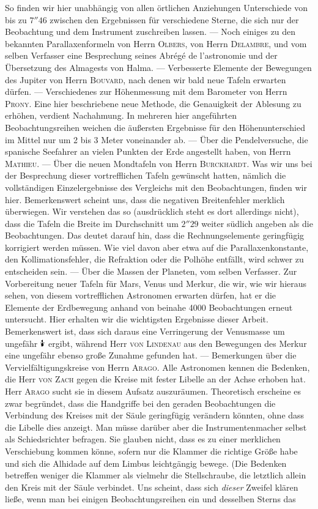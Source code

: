 So finden wir hier unabhängig von allen örtlichen Anziehungen Unterschiede von bis zu $7''46$ zwischen den Ergebnissen für verschiedene Sterne, die sich nur der Beobachtung und dem Instrument zuschreiben lassen. --- Noch einiges zu den bekannten Parallaxenformeln von Herrn \textsc{Olbers}, von Herrn \textsc{Delambre}, und vom selben Verfasser eine Besprechung seines Abrégé de l'astronomie und der Übersetzung des Almagests von Halma. --- Verbesserte Elemente der Bewegungen des Jupiter von Herrn \textsc{Bouvard}, nach denen wir bald neue Tafeln erwarten dürfen. --- Verschiedenes zur Höhenmessung mit dem Barometer von Herrn \textsc{Prony}. Eine hier beschriebene neue Methode, die Genauigkeit der Ablesung zu erhöhen, verdient Nachahmung. In mehreren hier angeführten Beobachtungsreihen weichen die äußersten Ergebnisse für den Höhenunterschied im Mittel nur um 2 bis 3 Meter voneinander ab. --- Über die Pendelversuche, die spanische Seefahrer an vielen Punkten der Erde angestellt haben, von Herrn \textsc{Mathieu}. --- Über die neuen Mondtafeln von Herrn \textsc{Burckhardt}. Was wir uns bei der Besprechung dieser vortrefflichen Tafeln gewünscht hatten, nämlich die vollständigen Einzelergebnisse des Vergleichs mit den Beobachtungen, finden wir hier. Bemerkenswert scheint uns, dass die negativen Breitenfehler merklich überwiegen. Wir verstehen das so (ausdrücklich steht es dort allerdings nicht), dass die Tafeln die Breite im Durchschnitt um $2''29$ weiter südlich angeben als die Beobachtungen. Das deutet darauf hin, dass die Rechnungselemente geringfügig korrigiert werden müssen. Wie viel davon aber etwa auf die Parallaxenkonstante, den Kollimationsfehler, die Refraktion oder die Polhöhe entfällt, wird schwer zu entscheiden sein. --- Über die Massen der Planeten, vom selben Verfasser. Zur Vorbereitung neuer Tafeln für Mars, Venus und Merkur, die wir, wie wir hieraus sehen, von diesem vortrefflichen Astronomen erwarten dürfen, hat er die Elemente der Erdbewegung anhand von beinahe 4000 Beobachtungen erneut untersucht. Hier erhalten wir die wichtigsten Ergebnisse dieser Arbeit. Bemerkenswert ist, dass sich daraus eine Verringerung der Venusmasse um ungefähr $\ObservedVenusFraction$ ergibt, während Herr \textsc{von Lindenau} aus den Bewegungen des Merkur eine ungefähr ebenso große Zunahme gefunden hat. --- Bemerkungen über die Vervielfältigungskreise von Herrn \textsc{Arago}. Alle Astronomen kennen die Bedenken, die Herr \textsc{von Zach} gegen die Kreise mit fester Libelle an der Achse erhoben hat. Herr \textsc{Arago} sucht sie in diesem Aufsatz auszuräumen. Theoretisch erscheine es zwar begründet, dass die Handgriffe bei den geraden Beobachtungen die Verbindung des Kreises mit der Säule geringfügig verändern könnten, ohne dass die Libelle dies anzeigt. Man müsse darüber aber die Instrumentenmacher selbst als Schiedsrichter befragen. Sie glauben nicht, dass es zu einer merklichen Verschiebung kommen könne, sofern nur die Klammer die richtige Größe habe und sich die Alhidade auf dem Limbus leichtgängig bewege. (Die Bedenken betreffen weniger die Klammer als vielmehr die Stellschraube, die letztlich allein den Kreis mit der Säule verbindet. Uns scheint, dass sich \emph{dieser} Zweifel klären ließe, wenn man bei einigen Beobachtungsreihen ein und desselben Sterns das 